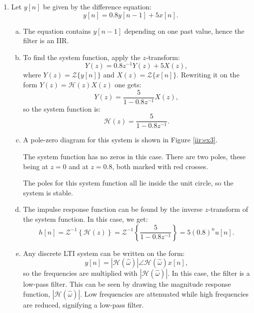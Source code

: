 \begin{enumerate}
\item Let $y[n]$ be given by the difference equation:
$$y[n]=0.8y[n-1]+5x[n].$$

\begin{enumerate}[a)]
\item The equation contains $y[n-1]$ depending on one past value, hence the filter is an IIR.

\item To find the system function, apply the $z$-transform:
$$Y(z)=0.8z^{-1}Y(z)+5X(z),$$
where $Y(z)=\mathcal{Z}\{y[n]\}$ and $X(z)=\mathcal{Z}\{x[n]\}$. Rewriting it on the form $Y(z)=\mathcal{H}(z)X(z)$ one gets:
$$Y(z)=\frac{5}{1-0.8z^{-1}}X(z),$$
so the system function is:
$$\mathcal{H}(z)=\frac{5}{1-0.8z^{-1}}.$$

\item A pole-zero diagram for this system is shown in Figure \ref{iir:ex3}.
\begin{marginfigure}[-5cm]
\begin{center}
\end{center}
\caption{The system function has no zeros in this case. There are two poles, these being at $z=0$ and at $z=0.8$, both marked with red crosses.}
\label{iir:ex3}
\end{marginfigure}

The poles for this system function all lie inside the unit circle, so the system is stable. 

\item The impulse response function can be found by the inverse $z$-transform of the system function. In this case, we get:
$$h[n]=\mathcal{Z}^{-1}\left\{\mathcal{H}(z)\right\}=\mathcal{Z}^{-1}\left\{\frac{5}{1-0.8z^{-1}}\right\}=5(0.8)^{n}u[n].$$

\item Any discrete LTI system can be written on the form: $$y[n]=|\mathcal{H}(\hat{\omega})|\angle\mathcal{H}(\hat{\omega}) x[n],$$
so the frequencies are multiplied with $|\mathcal{H}(\hat{\omega})|$. In this case, the filter is a low-pass filter. This can be seen by drawing the magnitude response function, $|\mathcal{H}(\hat{\omega})|$. Low frequencies are attenuated while high frequencies are reduced, signifying a low-pass filter. 


\end{enumerate}
\end{enumerate}
